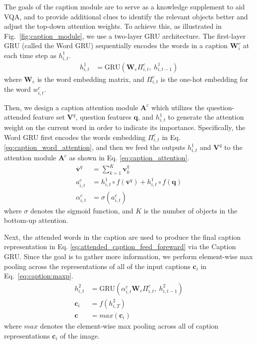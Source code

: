 \documentclass[11pt,a4paper]{article}
\begin{document}
The goals of the caption module are to serve as a knowledge supplement to aid VQA, and to provide additional clues to identify the relevant objects better and adjust the top-down attention weights.
To achieve this, as illustrated in Fig.\ \ref{fig:caption_module}, we use a two-layer GRU architecture. The first-layer GRU (called the Word GRU)  sequentially encodes the words in a caption $\textbf{W}^c_i$ at each time step as $h^1_{i,t}$. 
\begin{align}
    h^1_{i,t} &= \text{GRU}( \textbf{W}_e \Pi^c_{i,t},~ h^1_{i, t-1}) 
    \label{eq:caption_word_attention}
\end{align}   
where $\textbf{W}_e$ is the word embedding matrix, and $\Pi^c_{i,t}$ is the one-hot embedding for the word $w^c_{i,t}$.

Then, we design a caption attention module $\textbf{A}^c$ which utilizes the question-attended feature set $\textbf{V}^{q}$, question features $\textbf{q}$, and $h^1_{i,t}$ to generate the attention weight on the current word in order to indicate its importance. Specifically, the Word GRU first encodes the words embedding $\Pi^c_{i,t}$ in Eq. \ref{eq:caption_word_attention}, and then we feed the outputs $h^1_{i,t}$ and $\textbf{V}^{q}$ to the attention module $\textbf{A}^c$ as shown in Eq. \ref{eq:caption_attention}. 
\begin{align}
    \overline{\textbf{v}}^{q} &= \sum_{k = 1}^{K} \textbf{v}_k^{q}\\
    a^{c}_{i,t} &= h^1_{i,t} \circ f(\overline{\textbf{v}}^{q}) + h^1_{i,t} \circ f(\textbf{q}) \\
    \label{eq:caption_attention}
    \alpha^c_{i, t} &= \sigma(a^c_{i, t})
\end{align}
where $\sigma$ denotes the sigmoid function, and $K$ is the number of objects in the bottom-up attention.

Next, the attended words in the caption are used to produce the final caption representation in Eq. \ref{eq:attended_caption_feed_foreward} via the Caption GRU. Since the goal is to gather more information, we perform element-wise max pooling across the representations of all of the input captions $\textbf{c}_i$ in Eq.\ \ref{eq:caption:maxp}.
\begin{align} 
\label{eq:attended_caption_feed_foreward}
    h^2_{i,t} &= \text{GRU}( \alpha^c_{i, t}\textbf{W}_e \Pi^c_{i,t}, ~ h^2_{i,t-1})\\
    \textbf{c}_i &= f(h^2_{i,T})\\
    \label{eq:caption:maxp}
    \textbf{c} &= max(\textbf{c}_i)
\end{align}
where $max$ denotes the element-wise max pooling across all of caption representations $\textbf{c}_i$ of the image.
\end{document}
